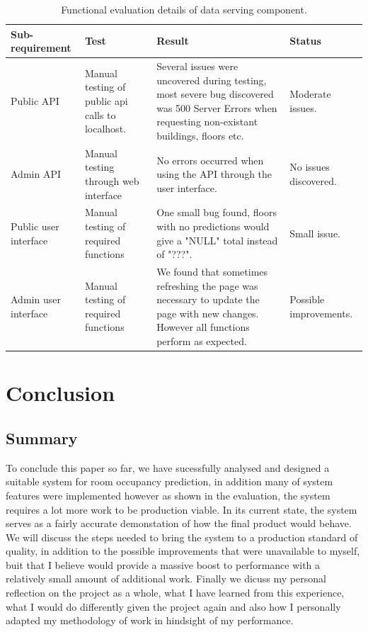 \documentclass{l4proj}
\begin{document}
\begin{table}
\begin{tabularx}{\textwidth}{|X|X|X|X|}
\hline
\textbf{Sub-requirement} & \textbf{Test} & \textbf{Result} & \textbf{Status}\tabularnewline
\hline
Public API & Manual testing of public api calls to localhost. & Several issues were uncovered during testing, most severe bug discovered was 500 Server Errors when requesting non-existant buildings, floors etc. & Moderate issues. \\
\hline
Admin API & Manual testing through web interface & No errors occurred when using the API through the user interface. & No issues discovered. \\
\hline
Public user interface & Manual testing of required functions & One small bug found, floors with no predictions would give a "NULL" total instead of "???". & Small issue. \\
\hline
Admin user interface & Manual testing of required functions & We found that sometimes refreshing the page was necessary to update the page with new changes. However all functions perform as expected. & Possible improvements. \\
\hline
\end{tabularx}
\caption{Functional evaluation details of data serving component.}
\label{table:evaldata}
\end{table}


\chapter{Conclusion}
\section{Summary}

To conclude this paper so far, we have sucessfully analysed and designed a suitable system for room occupancy prediction, in addition many of system features were implemented however as shown in the evaluation, the system requires a lot more work to be production viable. In its current state, the system serves as a fairly accurate demonstation of how the final product would behave. We will discuss the steps needed to bring the system to a production standard of quality, in addition to the possible improvements that were unavailable to myself, buit that I believe would provide a massive boost to performance with a relatively small amount of additional work. Finally we dicuss my personal reflection on the project as a whole, what I have learned from this experience, what I would do differently given the project again and also how I personally adapted my methodology of work in hindsight of my performance.
\end{document}
